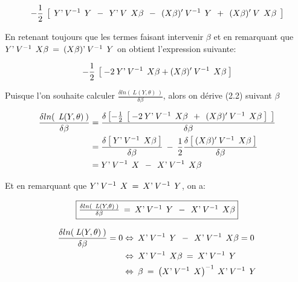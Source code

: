 \documentclass[11pt,fleqn]{book} %
\begin{document}
	$$ -\frac{1}{2} \:\left[\:\: Y\textnormal{'}\:V^{-1}\:\: Y \:\:-\:\: Y\textnormal{'} \:V\:\: X\beta \:\:-\:\: (X\beta)'\:V^{-1}\:\: Y \:\:+\:\: (X\beta)' \:V\:\: X\beta \:\:\right]$$ 
	
	\vspace{1em}
	
	En retenant toujours que les termes faisant intervenir $\beta$ et en remarquant que\\ $Y\textnormal{'}\: V^{-1}\:\:X\beta \:=\: (X\beta)\textnormal{'}\:V^{-1}\:\: Y$ on obtient l'expression suivante:
	
	\begin{equation}
		-\frac{1}{2}  \:\left[\: -2\: Y\textnormal{'} \:V^{-1}\:\: X\beta + (X\beta)' \:V^{-1}\:\: X\beta \:\right]
	\end{equation}
	
	\vspace{1em}
	
	Puisque l'on souhaite calculer $\frac{\delta ln(\:\textit{L}(Y,\theta)\:)}{\delta\beta}$, alors on dérive (2.2) suivant $\beta$
	
	\begin{align*}
		\frac{\delta ln(\:\:\textit{L}(Y,\theta)\:)}{\delta\beta} &= \frac{\delta \left[ -\frac{1}{2} \:\left[\: -2\: Y\textnormal{'} \:V^{-1}\:\: X\beta \:\:+\:\: (X\beta)' \:V^{-1}\:\: X\beta \:\right] \:\: \right] }{\delta\beta} \\
		&=  \frac{  \delta \left[\:  Y\textnormal{'} \:V^{-1}\:\: X\beta \:\right] }{\delta\beta} \:-\: \frac{1}{2}  \frac{\delta \left[\:  (X\beta)' \:V^{-1} \:\: X\beta \:\right] }{\delta\beta}\\
		&= Y\textnormal{'} \:V^{-1}\:\: X \:\:-\:\: X\textnormal{'} \:V^{-1}\:\: X\beta
	\end{align*}
	
	\vspace{1em}
	
	Et en remarquant que \quad $Y\textnormal{'} \:V^{-1}\:\: X\:=\:X\textnormal{'} \:V^{-1}\:\: Y$, on a:
	
	\begin{equation}
		\fbox{$
			\frac{\delta ln(\:\:\textit{L}(Y,\theta)\:)}{\delta\beta} \:=\: X\textnormal{'} \:V^{-1}\:\: Y \:\:-\:\: X\textnormal{'} \:V^{-1}\:\: X\beta
			$}
	\end{equation}
	
	\vspace{1em}
	
	\begin{align*}
		\frac{\delta ln(\:\textit{L}(Y,\theta)\:)}{\delta\beta}=0 &\Leftrightarrow \: X\textnormal{'} \:V^{-1}\:\: Y \:\:-\:\:  X\textnormal{'} \:V^{-1}\:\: X\beta = 0 \\
		& \Leftrightarrow \:   X\textnormal{'} \:V^{-1}\:\: X\beta \:=\:  X\textnormal{'} \:V^{-1}\:\: Y\\
		& \Leftrightarrow \: \beta \: = \: \left(  X\textnormal{'}\:V^{-1}\:\: X \right)^{-1}  \: X\textnormal{'} \:V^{-1}\:\: Y
	\end{align*}
	
\end{document}
